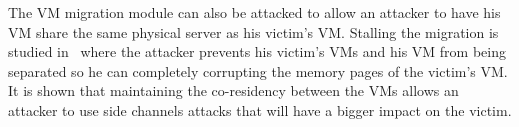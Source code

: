 The VM migration module can also be attacked to allow an attacker to have his VM share the same physical server as his victim's VM. Stalling the migration is studied in~\cite{stalling-atya2017} where the attacker prevents his victim's VMs and his VM from being separated so he can completely corrupting the memory pages of the victim's VM. It is shown that maintaining the co-residency between the VMs allows an attacker to use side channels attacks that will have a bigger impact on the victim.

\begin{table}[ht]
\end{table}
